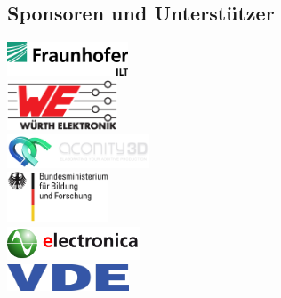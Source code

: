 \documentclass[a4paper,12pt,notumble]{leaflet}
\begin{document}
\noindent
\begin{minipage}[c][0.45\textheight][t]{\textwidth}
	\begin{center}
		\section{Sponsoren und Unterstützer}
		\vspace{1cm}
		\includegraphics[height= 1cm]{../Logos/ILT.png} \\ \vspace{0.3cm}
		\includegraphics[height= 1.5cm]{../Logos/Wuerth.png} \\ \vspace{0.3cm}
		\includegraphics[height= 1cm]{../Logos/aconity.png} \\ \vspace{0.3cm}
		\includegraphics[height= 1.5cm]{../Logos/BMBF.png} \\ \vspace{0.3cm}
		\includegraphics[height= 1cm]{../Logos/electronica.png} \\ \vspace{0.3cm}
		\includegraphics[height= 0.8cm]{../Logos/VDE.png}
	\end{center}
\end{minipage}
\end{document}
